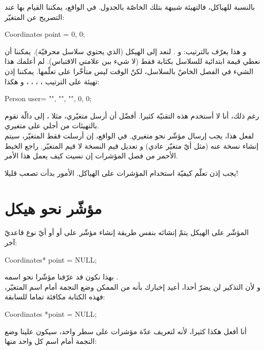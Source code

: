 بالنسبة للهياكل، فالتهيئة شبيهة بتلك الخاصّة بالجدول. في الواقع، يمكننا القيام بها عند التصريح عن المتغيّر:

\begin{Csource}
Coordinates point = {0, 0};
\end{Csource}

و هذا يعرّف بالترتيب:
و
.
لنعد إلى الهيكل
(الذي يحتوي سلاسل محرفيّة). يمكننا أن نعطي قيمة ابتدائية للسلاسل بكتابة فقط
(لا شيء ببن علامتي الاقتباس). لم أعلمك هذا الشيء في الفصل الخاصّ بالسلاسل، لكنّ الوقت ليس متأخّرا على تعلّمها.
يمكننا إذن تهيئة على الترتيب
،
،
،
،
و
هكذا:

\begin{Csource}
Person user= {"", "", "", 0, 0};
\end{Csource}

رغم ذلك، أنا لا أستخدم هذه التقنيّة كثيرا. أفضّل أن أرسل متغيّري، مثلا
،
إلى دالّة
تقوم بالتهيئات من أجلي على متغيري.\\
لفعل هذا، يجب إرسال مؤشّر نحو متغيري. في الواقع، إن أرسلت فقط المتغيّر، سيتم إنشاء نسخة عنه (مثل أيّ متغيّر عادي) و تعديل قيم النسخة لا قيم المتغيّر. راجع الخيط الأحمر من فصل المؤشرات إن نسيت كيف يعمل هذا الأمر.

يجب إذن تعلّم كيفيّة استخدام المؤشرات على الهياكل. الأمور بدأت تصعب قليلا!

\section{مؤشّر نحو هيكل}

المؤشّر على الهيكل يتمّ إنشائه بنفس طريقة إنشاء مؤشّر على
أو
أو أيّ نوع قاعديّ آخر:

\begin{Csource}
Coordinates* point = NULL;
\end{Csource}
بهذا نكون قد عرّفنا مؤشّرا نحو
اسمه
.\\
و لأن التذكير لن يضرّ أحدا، أعيد إخبارك بأنه من الممكن وضع النجمة أمام اسم المتغيّر، فهذه الكتابة مكافئة تماما للسابقة:

\begin{Csource}
Coordinates *point = NULL;
\end{Csource}

أنا أفعل هكذا كثيرا، لأنه لتعريف عدّة مؤشرات على سطر واحد، سيكون علينا وضع النجمة أمام اسم كل واحد منها:


